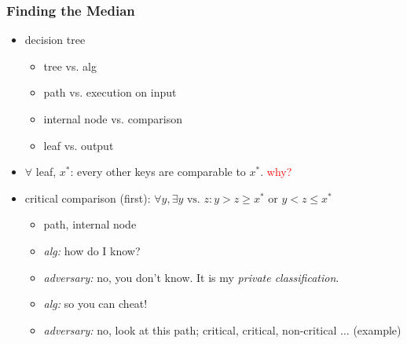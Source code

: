 \documentclass{beamer}
\begin{document}
\begin{frame}
  \frametitle{Finding the Median}
  
  \begin{example}
    \begin{itemize}
      \item decision tree
		\begin{itemize}
		  \item tree vs. alg
		  \item path vs. execution on input
		  \item internal node vs. comparison
		  \item leaf vs. output
		\end{itemize}
      \item $\forall$ leaf, $x^{\ast}$: every other keys are comparable to
      $x^{\ast}$. \textcolor{red}{why?}
      \item critical comparison (first): $\forall y, \exists y \textrm{ vs. } z:
      y > z \geq x^{\ast} \textrm{ or } y < z \leq x^{\ast}$
		\begin{itemize}
		  \item path, internal node
		  \item \emph{alg:} how do I know?
		  \item \emph{adversary:} no, you don't know. It is my \emph{private
		  classification}.
		  \item \emph{alg:} so you can cheat!
		  \item \emph{adversary:} no, look at this path; critical, critical,
		  non-critical $\ldots$ (example)
		\end{itemize}
    \end{itemize}
  \end{example}
\end{frame}
\end{document}
